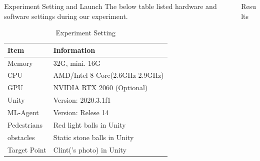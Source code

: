 \documentclass[final]{beamer}
\newlength{\onecolwid}
\newlength{\twocolwid}
\begin{document}
\begin{frame}[t]
\begin{columns}[t]
\begin{column}{\twocolwid}
\begin{columns}[t,totalwidth=\twocolwid]
\begin{column}{\onecolwid}
\begin{block}{Experiment Setting and Launch}
The below table listed hardware and software settings during our experiment.
\begin{table}
\vspace{2ex}
\begin{tabular}{l l }
\toprule
\textbf{Item} & \textbf{Information}\\
\midrule
Memory & 32G, mini. 16G  \\
CPU & AMD/Intel 8 Core(2.6GHz-2.9GHz) \\
GPU& NVIDIA RTX 2060 (Optional)\\
Unity& Version: 2020.3.1f1 \\
ML-Agent& Version: Relese 14 \\
Pedestrians& Red light balls in Unity\\
obstacles& Static stone balls in Unity \\
Target Point& Clint('s photo) in Unity \\
\bottomrule
\end{tabular}
\caption{Experiment Setting}
\end{table}


\end{block}


\end{column} %

\begin{column}{\onecolwid} %


\begin{block}{Results}


\end{block}
\end{column}
\end{columns}
\end{column}
\end{columns}
\end{frame}
\end{document}
